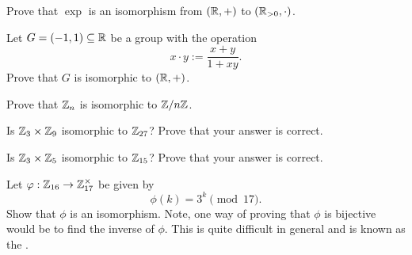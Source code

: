 \documentclass{ximera}
\begin{document}
\begin{exercise}
  Prove that $\exp$ is an isomorphism from $(\mathbb R,+)$ to $(\mathbb R_{>
    0},\cdot)$.
\end{exercise}


\begin{exercise}
  Let $G = (-1,1)\subseteq \mathbb R$ be a group with the operation
  \[
  x\cdot y := \frac{x+y}{1+xy}.
  \]
  Prove that $G$ is isomorphic to $(\mathbb R,+)$.
\end{exercise}

\begin{exercise}
  Prove that $\mathbb Z_n$ is isomorphic to $\mathbb Z/n\mathbb Z$.
\end{exercise}


\begin{exercise}
  Is $\mathbb Z_3\times \mathbb Z_9$ isomorphic to $\mathbb Z_{27}$? Prove that your answer
  is correct.
\end{exercise}

\begin{exercise}
  Is $\mathbb Z_3\times \mathbb Z_5$ isomorphic to $\mathbb Z_{15}$? Prove that your answer
  is correct.
\end{exercise}

\begin{exercise}
  Let $\varphi:\mathbb Z_{16}\to\mathbb Z_{17}^\times$ be given by
  \[
  \phi(k)= 3^k \pmod{17}.
  \]
  Show that $\phi$ is an isomorphism. Note, one way of proving that
  $\phi$ is bijective would be to find the inverse of $\phi$. This is
  quite difficult in general and is known as the .
\end{exercise}





\end{document}
